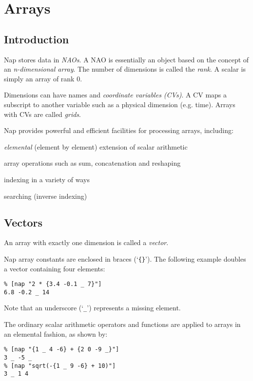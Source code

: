 
\section{Arrays}
    \label{array}
    \label{array-Arrays}

\subsection{Introduction}
    \label{array-Introduction}

    Nap stores data in 
  \emph{NAOs}. A NAO is essentially an object based on the concept of
  an 
  \emph{n-dimensional array}. The number of dimensions is called the 
  \emph{rank}. A scalar is simply an array of rank 0.
  

Dimensions can have names and 
  \emph{coordinate variables (CVs)}. A CV maps a subscript to another
  variable such as a physical dimension (e.g. time). Arrays with CVs
  are called 
  \emph{grids}.
  

Nap provides powerful and efficient facilities for processing
  arrays, including:
\begin{bullets}
    \item 
    \emph{elemental} (element by element) extension of scalar
    arithmetic
    \item array operations such as sum, concatenation and reshaping
    \item indexing in a variety of ways
    \item searching (inverse indexing)
\end{bullets}

\subsection{Vectors}
\label{array-Vectors}

  An array with exactly one dimension is called a 
  \emph{vector}.
  
Nap array constants are enclosed in braces (`\texttt{\{\}}').
The following example doubles a vector containing four elements:
  \begin{verbatim}
% [nap "2 * {3.4 -0.1 _ 7}"]
6.8 -0.2 _ 14
\end{verbatim}

Note that an underscore (`\texttt{\_}') represents a missing element.
  

The ordinary scalar arithmetic operators and functions are applied
  to arrays in an elemental fashion, as shown by:
  \begin{verbatim}
% [nap "{1 _ 4 -6} + {2 0 -9 _}"]
3 _ -5 _
% [nap "sqrt(-{1 _ 9 -6} + 10)"]
3 _ 1 4
\end{verbatim}

